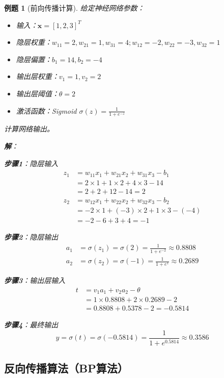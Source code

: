 \documentclass[12pt,a4paper]{ctexart}
\newtheorem{exercise}{例题}[section]
\begin{document}
\begin{exercise}[前向传播计算]
给定神经网络参数：
\begin{itemize}
    \item 输入：$\mathbf{x} = [1, 2, 3]^T$
    \item 隐层权重：$w_{11}=2, w_{21}=1, w_{31}=4; w_{12}=-2, w_{22}=-3, w_{32}=1$
    \item 隐层偏置：$b_1=14, b_2=-4$
    \item 输出层权重：$v_1=1, v_2=2$
    \item 输出层阈值：$\theta=2$
    \item 激活函数：Sigmoid $\sigma(z) = \frac{1}{1+e^{-z}}$
\end{itemize}

计算网络输出。

\textbf{解}：

\textbf{步骤1}：隐层输入
\begin{align*}
z_1 &= w_{11}x_1 + w_{21}x_2 + w_{31}x_3 - b_1 \\
&= 2 \times 1 + 1 \times 2 + 4 \times 3 - 14 \\
&= 2 + 2 + 12 - 14 = 2 \\
z_2 &= w_{12}x_1 + w_{22}x_2 + w_{32}x_3 - b_2 \\
&= -2 \times 1 + (-3) \times 2 + 1 \times 3 - (-4) \\
&= -2 - 6 + 3 + 4 = -1
\end{align*}

\textbf{步骤2}：隐层输出
\begin{align*}
a_1 &= \sigma(z_1) = \sigma(2) = \frac{1}{1+e^{-2}} \approx 0.8808 \\
a_2 &= \sigma(z_2) = \sigma(-1) = \frac{1}{1+e^{1}} \approx 0.2689
\end{align*}

\textbf{步骤3}：输出层输入
\begin{align*}
t &= v_1a_1 + v_2a_2 - \theta \\
&= 1 \times 0.8808 + 2 \times 0.2689 - 2 \\
&= 0.8808 + 0.5378 - 2 = -0.5814
\end{align*}

\textbf{步骤4}：最终输出
\[
y = \sigma(t) = \sigma(-0.5814) = \frac{1}{1+e^{0.5814}} \approx \boxed{0.3586}
\]
\end{exercise}

\subsection{反向传播算法（BP算法）}
\end{document}

